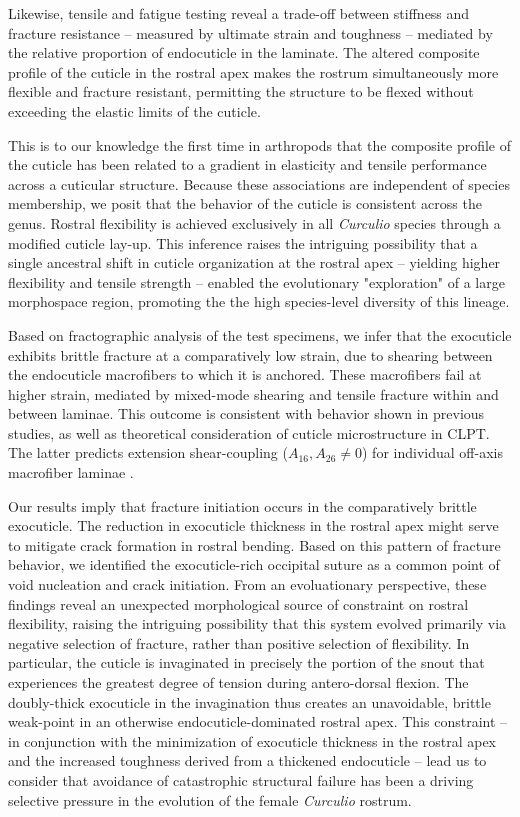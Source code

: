 \documentclass[twocolumn, linenumbers, superscriptaddress, nofootinbib]{revtex4-1}
\begin{document}
		Likewise, tensile and fatigue testing reveal a trade-off between stiffness and fracture resistance -- measured by ultimate strain and toughness -- mediated by the relative proportion of endocuticle in the laminate.
		The altered composite profile of the cuticle in the rostral apex makes the rostrum simultaneously more flexible and fracture resistant, permitting the structure to be flexed without exceeding the elastic limits of the cuticle.
	
		This is to our knowledge the first time in arthropods that the composite profile of the cuticle has been related to a gradient in elasticity and tensile performance across a cuticular structure.
		Because these associations are independent of species membership, we posit that the behavior of the cuticle is consistent across the genus.
		Rostral flexibility is achieved exclusively in all \textit{Curculio} species through a modified cuticle lay-up.
		This inference raises the intriguing possibility that a single ancestral shift in cuticle organization at the rostral apex -- yielding higher flexibility and tensile strength -- enabled the evolutionary "exploration" of a large morphospace region, promoting the the high species-level diversity of this lineage.
		
		Based on fractographic analysis of the test specimens, we infer that the exocuticle exhibits brittle fracture at a comparatively low strain, due to shearing between the endocuticle macrofibers to which it is anchored.
		These macrofibers fail at higher strain, mediated by mixed-mode shearing and tensile fracture within and between laminae.
		This outcome is consistent with behavior shown in previous studies, as well as theoretical consideration of cuticle microstructure in CLPT.
		The latter predicts extension shear-coupling ($A_{16}, A_{26}\neq{0}$) for individual off-axis macrofiber laminae \cite{Jones2014, Reddy2004}.
		
		Our results imply that fracture initiation occurs in the comparatively brittle exocuticle.
		The reduction in exocuticle thickness in the rostral apex might serve to mitigate crack formation in rostral bending.
		Based on this pattern of fracture behavior, we identified the exocuticle-rich occipital suture as a common point of void nucleation and crack initiation.
		From an evoluationary perspective, these findings reveal an unexpected morphological source of constraint on rostral flexibility, raising the intriguing possibility that this system evolved primarily via negative selection of fracture, rather than positive selection of flexibility.
		In particular, the cuticle is invaginated in precisely the portion of the snout that experiences the greatest degree of tension during antero-dorsal flexion.
		The doubly-thick exocuticle in the invagination thus creates an unavoidable, brittle weak-point in an otherwise endocuticle-dominated rostral apex.
		This constraint -- in conjunction with the minimization of exocuticle thickness in the rostral apex and the increased toughness derived from a thickened endocuticle -- lead us to consider that avoidance of catastrophic structural failure has been a driving selective pressure in the evolution of the female \textit{Curculio} rostrum.	
		
\end{document}
